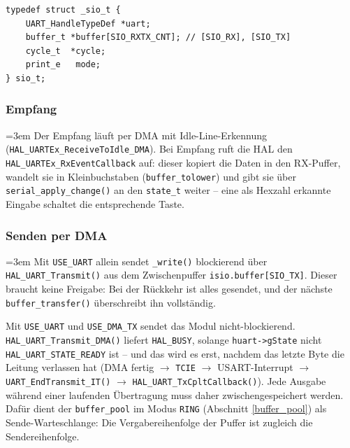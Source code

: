 \begin{listing}
\begin{verbatim}
typedef struct _sio_t {
    UART_HandleTypeDef *uart;
    buffer_t *buffer[SIO_RXTX_CNT]; // [SIO_RX], [SIO_TX]
    cycle_t  *cycle;
    print_e   mode;
} sio_t;
\end{verbatim}
\caption{Konfigurations-Struktur \texttt{sio\_t}}
\label{sio_t}
\end{listing}

\subsubsection*{Empfang}
{\sloppy\emergencystretch=3em
Der Empfang läuft per DMA mit Idle-Line-Erkennung
(\verb|HAL_UARTEx_ReceiveToIdle_DMA|). Bei Empfang ruft die HAL den
\verb|HAL_UARTEx_RxEventCallback| auf: dieser kopiert die Daten in den
RX-Puffer, wandelt sie in Kleinbuchstaben (\verb|buffer_tolower|) und gibt
sie über \verb|serial_apply_change()| an den \verb|state_t| weiter -- eine als
Hexzahl erkannte Eingabe schaltet die entsprechende Taste.
\par}

\subsubsection*{Senden per DMA}\label{serial_dma_tx}
{\sloppy\emergencystretch=3em
Mit \verb|USE_UART| allein sendet \verb|_write()| blockierend über
\verb|HAL_UART_Transmit()| aus dem Zwischenpuffer \verb|isio.buffer[SIO_TX]|.
Dieser braucht keine Freigabe: Bei der Rückkehr ist alles gesendet, und der
nächste \verb|buffer_transfer()| überschreibt ihn vollständig.

Mit \verb|USE_UART| und \verb|USE_DMA_TX| sendet das Modul nicht-blockierend.
\verb|HAL_UART_Transmit_DMA()| liefert \verb|HAL_BUSY|, solange
\verb|huart->gState| nicht \verb|HAL_UART_STATE_READY| ist -- und das wird es
erst, nachdem das letzte Byte die Leitung verlassen hat (DMA fertig
$\rightarrow$ \verb|TCIE| $\rightarrow$ USART-Interrupt $\rightarrow$
\verb|UART_EndTransmit_IT()| $\rightarrow$ \verb|HAL_UART_TxCpltCallback()|).
Jede Ausgabe während einer laufenden Übertragung muss daher zwischengespeichert
werden. Dafür dient der \verb|buffer_pool| im Modus \verb|RING| (Abschnitt
\ref{buffer_pool}) als Sende-Warteschlange: Die Vergabereihenfolge der Puffer
ist zugleich die Sendereihenfolge.
\par}


